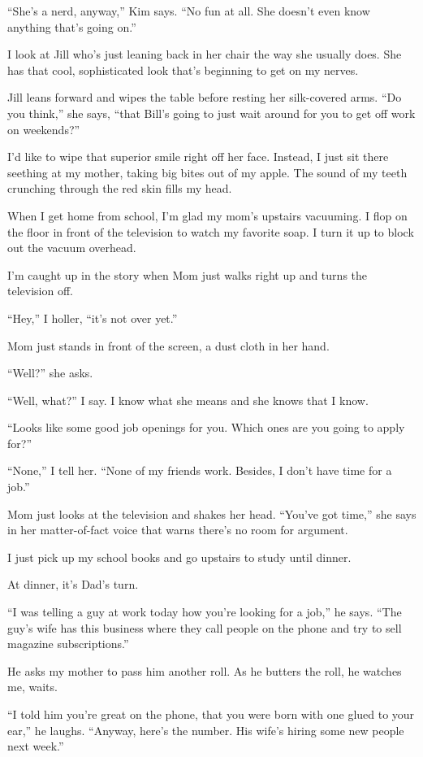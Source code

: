 \documentclass[
]{article}
\begin{document}
``She's a nerd, anyway,'' Kim says. ``No fun at all. She doesn't even
know anything that's going on.''

I look at Jill who's just leaning back in her chair the way she usually
does. She has that cool, sophisticated look that's beginning to get on
my nerves.

Jill leans forward and wipes the table before resting her silk-covered
arms. ``Do you think,'' she says, ``that Bill's going to just wait
around for you to get off work on weekends?''

I'd like to wipe that superior smile right off her face. Instead, I just
sit there seething at my mother, taking big bites out of my apple. The
sound of my teeth crunching through the red skin fills my head.

When I get home from school, I'm glad my mom's upstairs vacuuming. I
flop on the floor in front of the television to watch my favorite soap.
I turn it up to block out the vacuum overhead.

I'm caught up in the story when Mom just walks right up and turns the
television off.

``Hey,'' I holler, ``it's not over yet.''

Mom just stands in front of the screen, a dust cloth in her hand.

``Well?'' she asks.

``Well, what?'' I say. I know what she means and she knows that I know.

``Looks like some good job openings for you. Which ones are you going to
apply for?''

``None,'' I tell her. ``None of my friends work. Besides, I don't have
time for a job.''

Mom just looks at the television and shakes her head. ``You've got
time,'' she says in her matter-of-fact voice that warns there's no room
for argument.

I just pick up my school books and go upstairs to study until dinner.

At dinner, it's Dad's turn.

``I was telling a guy at work today how you're looking for a job,'' he
says. ``The guy's wife has this business where they call people on the
phone and try to sell magazine subscriptions.''

He asks my mother to pass him another roll. As he butters the roll, he
watches me, waits.

``I told him you're great on the phone, that you were born with one
glued to your ear,'' he laughs. ``Anyway, here's the number. His wife's
hiring some new people next week.''
\end{document}
